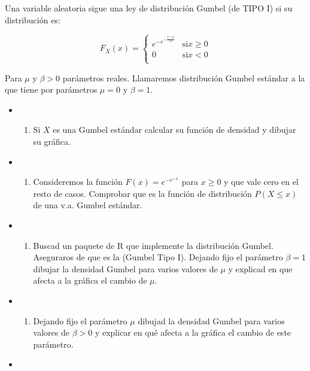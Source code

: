 \documentclass[
]{article}
\providecommand{\tightlist}{%
  \setlength{\itemsep}{0pt}\setlength{\parskip}{0pt}}
\begin{document}
Una variable aleatoria sigue una ley de distribución Gumbel (de TIPO I)
si su distribución es:

\[
F_X(x)=\left\{
\begin{array}{ll}
  e^{-e^{-\frac{x-\mu}{\beta}}} & \mbox{si} x\geq 0\\
 0 & \mbox{si} x< 0\\
\end{array}
\right.
\]

Para \(\mu\) y \(\beta>0\) parámetros reales. Llamaremos distribución
Gumbel estándar a la que tiene por parámetros \(\mu=0\) y \(\beta=1.\)

\begin{itemize}
\item
  \begin{enumerate}
  \def\labelenumi{\alph{enumi})}
  \tightlist
  \item
    Si \(X\) es una Gumbel estándar calcular su función de densidad y
    dibujar su gráfica.
  \end{enumerate}
\item
  \begin{enumerate}
  \def\labelenumi{\alph{enumi})}
  \setcounter{enumi}{1}
  \tightlist
  \item
    Consideremos la función \(F(x)=e^{-e^{-x}}\) para \(x\geq 0\) y que
    vale cero en el resto de casos. Comprobar que es la función de
    distribución \(P(X\leq x)\) de una v.a. Gumbel estándar.
  \end{enumerate}
\item
  \begin{enumerate}
  \def\labelenumi{\alph{enumi})}
  \setcounter{enumi}{2}
  \tightlist
  \item
    Buscad un paquete de R que implemente la distribución Gumbel.
    Aseguraros de que es la (Gumbel Tipo I). Dejando fijo el parámetro
    \(\beta=1\) dibujar la densidad Gumbel para varios valores de
    \(\mu\) y explicad en que afecta a la gráfica el cambio de \(\mu\).
  \end{enumerate}
\item
  \begin{enumerate}
  \def\labelenumi{\alph{enumi})}
  \setcounter{enumi}{3}
  \tightlist
  \item
    Dejando fijo el parámetro \(\mu\) dibujad la densidad Gumbel para
    varios valores de \(\beta>0\) y explicar en qué afecta a la gráfica
    el cambio de este parámetro.
  \end{enumerate}
\item

\end{itemize}
\end{document}
